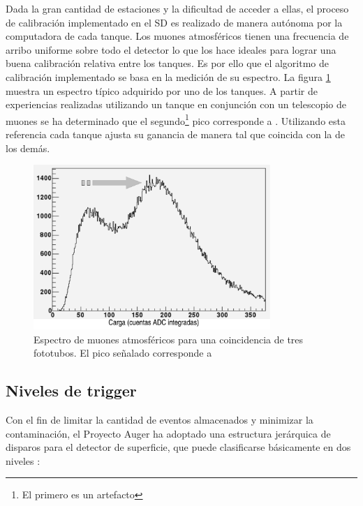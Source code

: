 		Dada la gran cantidad de estaciones y la dificultad de acceder a ellas, el proceso de calibraci\'on implementado en el SD es realizado de manera aut\'onoma por la computadora de cada tanque. 
		Los muones atmosf\'ericos tienen una frecuencia de arribo uniforme sobre todo el detector lo que los hace ideales para lograr una buena calibraci\'on relativa entre los tanques. 
		Es por ello que el algoritmo de calibraci\'on implementado se basa en la medici\'on de su espectro. 
		La figura \ref{Calibracion_Muones} muestra un espectro t\'ipico adquirido por uno de los tanques. 
		A partir de experiencias realizadas utilizando un tanque en conjunci\'on con un telescopio de muones se ha determinado que el segundo\footnote{El primero es un artefacto} pico corresponde a . 
		Utilizando esta referencia cada tanque ajusta su ganancia de manera tal que coincida con la de los dem\'as.
		
		\begin{figure}[ht]
			\begin{center}
			\includegraphics[width=0.8\textwidth]{fig/detectorAuger/vem}
			\caption{Espectro de muones atmosf\'ericos para una coincidencia de tres fototubos. El pico se\~nalado corresponde a }
			\label{Calibracion_Muones}
			\end{center}
		\end{figure}
		
		
		\subsection{\label{sbsc:trig_levels}Niveles de trigger}
		
		Con el fin de limitar la cantidad de eventos almacenados y minimizar la contaminaci\'on, el Proyecto Auger ha adoptado una estructura jer\'arquica de disparos para el detector de superficie, que puede clasificarse b\'asicamente en dos niveles \cite{icrctri}:
		
